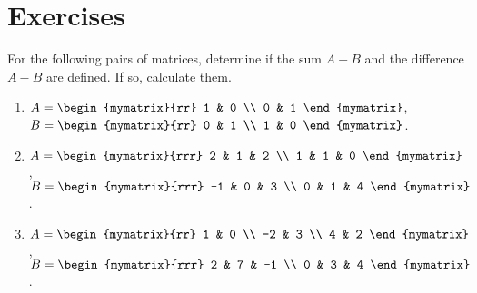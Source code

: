 \section*{Exercises}

\begin{ex}
  For the following pairs of matrices, determine if the sum $A+B$
  and the difference $A-B$ are defined. If so, calculate them.
  \begin{enumerate}
  \item
    $A = \begin{mymatrix}{rr}
      1 & 0 \\
      0 & 1
    \end{mymatrix}$,\quad
    $B = \begin{mymatrix}{rr}
      0 & 1 \\
      1 & 0
    \end{mymatrix}$.

  \item
    $A = \begin{mymatrix}{rrr}
      2 & 1 & 2 \\
      1 & 1 & 0
    \end{mymatrix}$,\quad
    $B = \begin{mymatrix}{rrr}
      -1 & 0 & 3 \\
      0 & 1 & 4
    \end{mymatrix}$.

  \item
    $A = \begin{mymatrix}{rr}
      1 & 0 \\
      -2 & 3 \\
      4 & 2
    \end{mymatrix}$,\quad
    $B = \begin{mymatrix}{rrr}
      2 & 7 & -1 \\
      0 & 3 & 4
    \end{mymatrix}$.
  \end{enumerate}
\end{ex}

